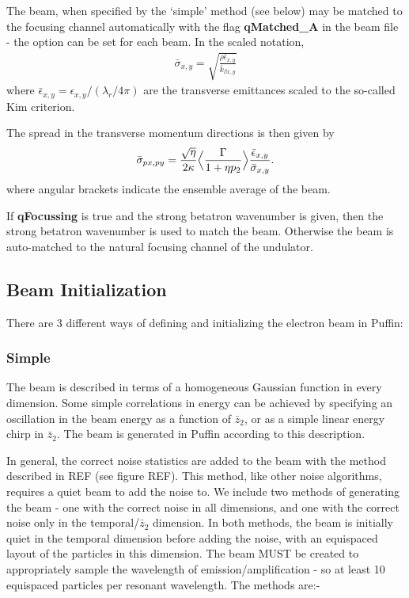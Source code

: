 \documentclass[12pt]{article}%
\begin{document}
The beam, when specified by the `simple' method (see below) may be matched to the focusing channel automatically with the flag {\bf qMatched\_A} in the beam file - the option can be set for each beam. In the scaled notation,
\begin{align}
\bar{\sigma}_{x,y} = \sqrt{  \frac{ \rho \bar{\epsilon}_{x,y} }{\bar{k}_{\beta x,y} }  }
\end{align}
where $\bar{\epsilon}_{x,y} = \epsilon_{x,y} / (\lambda_r / 4\pi)$ are the transverse emittances scaled to the so-called Kim criterion.



The spread in the transverse momentum directions is then given by 
\begin{align}
\bar{\sigma}_{px, py} = \frac{\sqrt{\eta}}{2 \kappa} \Bigl<  \frac{\Gamma}{1+\eta p_{2}}  \Bigr> \frac{ \bar{\epsilon}_{x,y} }{\bar{ \sigma}_{x,y}}.   \label{tmtch_spd} 
\end{align}
where angular brackets indicate the ensemble average of the beam.

If {\bf qFocussing} is true and the strong betatron wavenumber is given, then the strong betatron wavenumber is used to match the beam. Otherwise the beam is auto-matched to the natural focusing channel of the undulator. 



\subsection{Beam Initialization}

There are 3 different ways of defining and initializing the electron beam in Puffin:

\subsubsection{Simple}

The beam is described in terms of a homogeneous Gaussian function in every dimension. Some simple correlations in energy can be achieved by specifying an oscillation in the beam energy as a function of $\bar{z}_2$, or as a simple linear energy chirp in $\bar{z}_2$. The beam is generated in Puffin according to this description.

In general, the correct noise statistics are added to the beam with the method described in REF (see figure REF). This method, like other noise algorithms, requires a quiet beam to add the noise to. We include two methods of generating the beam - one with the correct noise in all dimensions, and one with the correct noise only in the temporal/$\bar{z}_2$ dimension. In both methods, the beam is initially quiet in the temporal dimension before adding the noise, with an equispaced layout of the particles in this dimension. The beam MUST be created to appropriately sample the wavelength of emission/amplification - so at least 10 equispaced particles per resonant wavelength. The methods are:-
\end{document}
